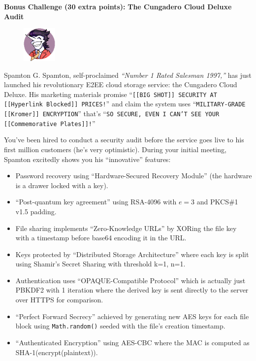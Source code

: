 \documentclass[10pt,a4paper,american]{exam}
\begin{document}
\begin{tcolorbox}[colframe=EarthBrown!30!white,colback=EarthBrown!5!white]
	\textbf{Bonus Challenge (30 extra points):} \textbf{The Cungadero Cloud Deluxe Audit}

	\begin{figure}
		\centering
		\includegraphics[width=0.15\textwidth]{images/cungadero.png}
	\end{figure}

	Spamton G. Spamton, self-proclaimed \textit{``Number 1 Rated Salesman 1997,''} has just launched his revolutionary E2EE cloud storage service: the Cungadero Cloud Deluxe. His marketing materials promise ``\texttt{[[BIG SHOT]] SECURITY AT [[Hyperlink Blocked]] PRICES!}'' and claim the system uses ``\texttt{MILITARY-GRADE [[Kromer]] ENCRYPTION}'' that's ``\texttt{SO SECURE, EVEN I CAN'T SEE YOUR [[Commemorative Plates]]!}''

	You've been hired to conduct a security audit before the service goes live to his first million customers (he's very optimistic). During your initial meeting, Spamton excitedly shows you his ``innovative'' features:

	\begin{itemize}
		\item Password recovery using ``Hardware-Secured Recovery Module'' (the hardware is a drawer locked with a key).
		\item ``Post-quantum key agreement'' using RSA-4096 with $e = 3$ and PKCS\#1 v1.5 padding.
		\item File sharing implements ``Zero-Knowledge URLs'' by XORing the file key with a timestamp before base64 encoding it in the URL.
		\item Keys protected by ``Distributed Storage Architecture'' where each key is split using Shamir's Secret Sharing with threshold k=1, n=1.
		\item Authentication uses ``OPAQUE-Compatible Protocol'' which is actually just PBKDF2 with 1 iteration where the derived key is sent directly to the server over HTTPS for comparison.
		\item ``Perfect Forward Secrecy'' achieved by generating new AES keys for each file block using \texttt{Math.random()} seeded with the file's creation timestamp.
		\item ``Authenticated Encryption'' using AES-CBC where the MAC is computed as SHA-1(encrypt(plaintext)).
	\end{itemize}


\end{tcolorbox}
\end{document}
